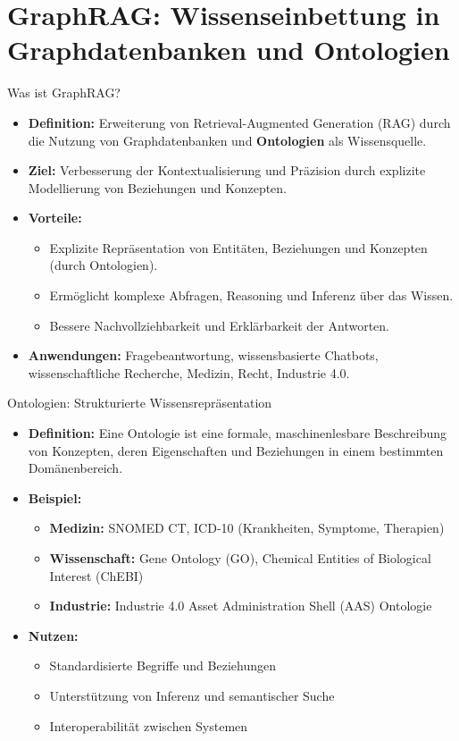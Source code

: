 \documentclass[aspectratio=1610, xcolor=dvipsnames, 9pt]{beamer}
\begin{document}
\section{GraphRAG: Wissenseinbettung in Graphdatenbanken und Ontologien}

\begin{frame}{Was ist GraphRAG?}
  \begin{itemize}
    \item \textbf{Definition:} Erweiterung von Retrieval-Augmented Generation (RAG) durch die Nutzung von Graphdatenbanken und \textbf{Ontologien} als Wissensquelle.
    \item \textbf{Ziel:} Verbesserung der Kontextualisierung und Präzision durch explizite Modellierung von Beziehungen und Konzepten.
    \item \textbf{Vorteile:}
      \begin{itemize}
        \item Explizite Repräsentation von Entitäten, Beziehungen und Konzepten (durch Ontologien).
        \item Ermöglicht komplexe Abfragen, Reasoning und Inferenz über das Wissen.
        \item Bessere Nachvollziehbarkeit und Erklärbarkeit der Antworten.
      \end{itemize}
    \item \textbf{Anwendungen:} Fragebeantwortung, wissensbasierte Chatbots, wissenschaftliche Recherche, Medizin, Recht, Industrie 4.0.
  \end{itemize}
\end{frame}

\begin{frame}{Ontologien: Strukturierte Wissensrepräsentation}
  \begin{itemize}
    \item \textbf{Definition:} Eine Ontologie ist eine formale, maschinenlesbare Beschreibung von Konzepten, deren Eigenschaften und Beziehungen in einem bestimmten Domänenbereich.
    \item \textbf{Beispiel:} 
      \begin{itemize}
        \item \textbf{Medizin:} SNOMED CT, ICD-10 (Krankheiten, Symptome, Therapien)
        \item \textbf{Wissenschaft:} Gene Ontology (GO), Chemical Entities of Biological Interest (ChEBI)
        \item \textbf{Industrie:} Industrie 4.0 Asset Administration Shell (AAS) Ontologie
      \end{itemize}
    \item \textbf{Nutzen:}
      \begin{itemize}
        \item Standardisierte Begriffe und Beziehungen
        \item Unterstützung von Inferenz und semantischer Suche
        \item Interoperabilität zwischen Systemen
      \end{itemize}
  \end{itemize}
\end{frame}
\end{document}
